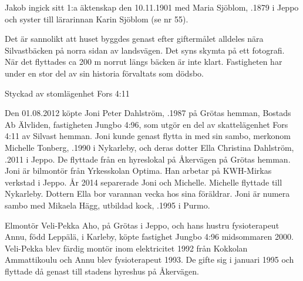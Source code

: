 Jakob ingick sitt 1:a äktenskap den 10.11.1901 med Maria Sjöblom, .1879 i Jeppo och syster till lärarinnan Karin Sjöblom (se nr 55).
\begin{jhchildren}
  \item {}
  \item {}
  \item {}
  \item {}
  \item {}
\end{jhchildren}
Det är sannolikt att huset byggdes genast efter giftermålet alldeles nära Silvastbäcken på norra sidan av landsvägen. Det syns skymta på ett fotografi. När det flyttades ca 200 m norrut längs bäcken är inte klart. Fastigheten har under en stor del av sin historia förvaltats som dödsbo.



Styckad av stomlägenhet Fors 4:11


Den 01.08.2012 köpte Joni Peter Dahlström, .1987 på Grötas hemman, Bostads Ab Älvliden, fastigheten Jungbo 4:96, som	utgör en del av skattelägenhet Fors 4:11 av Silvast hemman. Joni kunde	genast flytta in med sin sambo, merkonom Michelle Tonberg, .1990 i Nykarleby, och deras dotter Ella Christina Dahlström, .2011 i Jeppo. De flyttade från en hyreslokal på Åkervägen på 	Grötas hemman. Joni är bilmontör från Yrkesskolan Optima. Han arbetar på KWH-Mirkas verkstad i Jeppo. År 2014 separerade Joni och Michelle. Michelle flyttade till Nykarleby. Dottern Ella bor varannan vecka hos sina föräldrar. Joni är numera sambo med Mikaela Hägg, utbildad kock, 	.1995 i Purmo.


Elmontör Veli-Pekka Aho,  på Grötas i Jeppo, och hans hustru fysioterapeut Annu, född Leppälä,  i Karleby, köpte fastighet Jungbo 4:96 midsommaren 2000. Veli-Pekka blev färdig montör inom elektricitet 1992 från Kokkolan Ammattikoulu och Annu blev fysioterapeut 1993. De gifte sig i januari 1995 och flyttade då genast till stadens hyreshus på Åkervägen.


